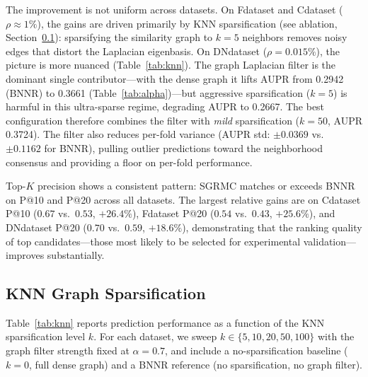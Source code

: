 \documentclass[webpdf,modern,large]{oup-authoring-template}
\begin{document}
The improvement is not uniform across datasets. On Fdataset and Cdataset ($\rho \approx 1\%$), the gains are driven primarily by KNN sparsification (see ablation, Section~\ref{sec:knn_ablation}): sparsifying the similarity graph to $k=5$ neighbors removes noisy edges that distort the Laplacian eigenbasis. On DNdataset ($\rho = 0.015\%$), the picture is more nuanced (Table~\ref{tab:knn}). The graph Laplacian filter is the dominant single contributor---with the dense graph it lifts AUPR from 0.2942 (BNNR) to 0.3661 (Table~\ref{tab:alpha})---but aggressive sparsification ($k=5$) is harmful in this ultra-sparse regime, degrading AUPR to 0.2667. The best configuration therefore combines the filter with \emph{mild} sparsification ($k=50$, AUPR 0.3724). The filter also reduces per-fold variance (AUPR std: $\pm 0.0369$ vs.\ $\pm 0.1162$ for BNNR), pulling outlier predictions toward the neighborhood consensus and providing a floor on per-fold performance.

Top-$K$ precision shows a consistent pattern: SGRMC matches or exceeds BNNR on P@10 and P@20 across all datasets. The largest relative gains are on Cdataset P@10 ($0.67$ vs.\ $0.53$, $+26.4\%$), Fdataset P@20 ($0.54$ vs.\ $0.43$, $+25.6\%$), and DNdataset P@20 ($0.70$ vs.\ $0.59$, $+18.6\%$), demonstrating that the ranking quality of top candidates---those most likely to be selected for experimental validation---improves substantially.

\subsection{KNN Graph Sparsification}
\label{sec:knn_ablation}

Table~\ref{tab:knn} reports prediction performance as a function of the KNN sparsification level $k$. For each dataset, we sweep $k \in \{5, 10, 20, 50, 100\}$ with the graph filter strength fixed at $\alpha = 0.7$, and include a no-sparsification baseline ($k=0$, full dense graph) and a BNNR reference (no sparsification, no graph filter).
\end{document}
